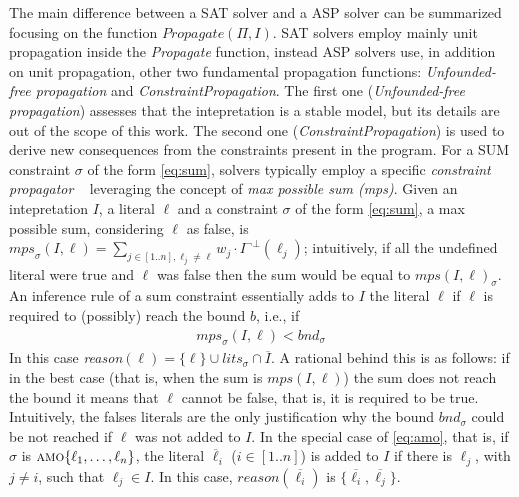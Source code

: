 The main difference between a SAT solver and a ASP solver can be summarized focusing on 
the function $\mathit{Propagate}(\Pi,I)$.
SAT solvers employ mainly unit propagation inside the \textit{Propagate} function,
instead ASP solvers use, in addition on unit propagation, other two fundamental  
propagation functions: \textit{Unfounded-free propagation} and \textit{ConstraintPropagation}.
The first one (\textit{Unfounded-free propagation}) assesses that the intepretation is a stable model, but its details
are out of the scope of this work.
The second one (\textit{ConstraintPropagation}) is used to derive new consequences from 
the constraints present in the program. 
For a SUM constraint $\sigma$ of the form \eqref{eq:sum},
solvers typically employ a 
specific \textit{constraint propagator}
~\cite{DBLP:conf/iclp/GebserKKS09,DBLP:journals/fuin/FaberLMR11} leveraging the concept of 
\textit{max possible sum (mps)}.
Given an intepretation $I$, a literal $\ell$ and a constraint $\sigma$ of the form \eqref{eq:sum}, 
a max possible sum, considering $\ell$ as false, is $\mathit{mps}_{\sigma}(I,\ell) = 
\sum_{j \in [1..n], \ell_j \neq \ell}{w_j \cdot I^{\neg\bot}(\ell_j)}$;
intuitively, if all the undefined literal were true and $\ell$ was false
then the sum would be equal to $\mathit{mps}(I,\ell)_{\sigma}$.
An inference rule of a sum constraint essentially adds to $I$ the literal $\ell$ 
if $\ell$ is required to (possibly) reach the bound $b$, i.e., if
\begin{align}\label{eq:sum:propagation}
    \mathit{mps}_{\sigma}(I,\ell) < \mathit{bnd}_{\sigma}
\end{align}
In this case \textit{reason}$(\ell) = \{\ell\} \cup lits_{\sigma} \cap \overline{I}$.
A rational behind this is as follows: if in the best case (that is, when the sum is $\mathit{mps}(I,\ell)$)
the sum does not reach the bound it means that $\ell$ cannot be false, that is, it is required to be true.
Intuitively, the falses literals are the only justification why the bound $\mathit{bnd}_{\sigma}$
could be not reached if $\ell$ was not added to $I$.
In the special case of \eqref{eq:amo}, that is, if $\sigma$ is $\textsc{amo}\{\ell_1, \ldots, \ell_n\}$, the literal $\overline{\ell}_i$ ($i \in [1..n]$) is added to $I$ if there is $\ell_j$, with $j \neq i$, such that $\ell_j \in I$.
In this case, $\mathit{reason}(\overline{\ell_i})$ is $\{\overline{\ell_i}, \overline{\ell_j}\}$.

